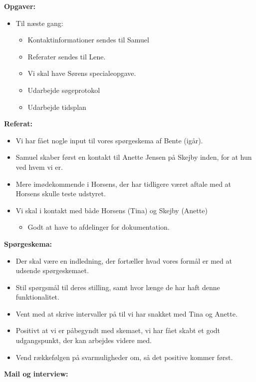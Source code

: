 \textbf{Opgaver:}
\begin{itemize}
\item Til næste gang: 
\begin{itemize}
\item Kontaktinformationer sendes til Samuel 
\item Referater sendes til Lene. 
\item Vi skal have Sørens specialeopgave. 
\item Udarbejde søgeprotokol
\item Udarbejde tidsplan
\end{itemize} 
\end{itemize} 
\textbf{Referat:}\\
\begin{itemize}
\item Vi har fået nogle input til vores spørgeskema af Bente (igår). 
\item Samuel skaber først en kontakt til Anette Jensen på Skejby inden, for at hun ved hvem vi er.
\item Mere imødekommende i Horsens, der har tidligere været aftale med at Horsens skulle teste udstyret.
\item Vi skal i kontakt med både Horsens (Tina) og Skejby (Anette)
\begin{itemize}
\item Godt at have to afdelinger for dokumentation.
\end{itemize}
\end{itemize}
\textbf{Spørgeskema:}
\begin{itemize}
\item Der skal være en indledning, der fortæller hvad vores formål er med at udsende spørgeskemaet.
\item Stil spørgsmål til deres stilling, samt hvor længe de har haft denne funktionalitet.
\item Vent med at skrive intervaller på til vi har snakket med Tina og Anette.
\item Positivt at vi er påbegyndt med skemaet, vi har fået skabt et godt udgangspunkt, der kan arbejdes videre med.
\item Vend rækkefølgen på svarmuligheder om, så det positive kommer først.
\end{itemize}
\textbf{Mail og interview:}
